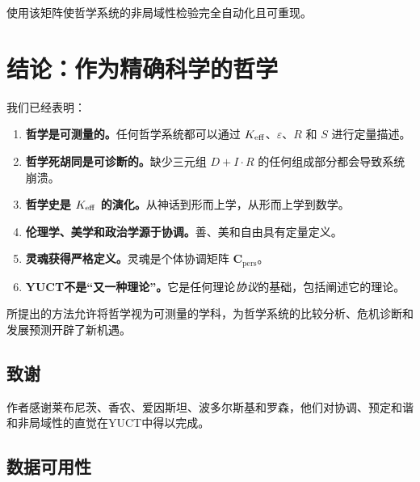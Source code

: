\documentclass[11pt,a4paper]{article}
\newcommand{\eps}{\varepsilon}
\newcommand{\Cpers}{\mathbf{C}_{\text{pers}}}
\begin{document}
	使用该矩阵使哲学系统的非局域性检验完全自动化且可重现。
	
	
	\section{结论：作为精确科学的哲学}
	
	我们已经表明：
	
	\begin{enumerate}
		\item \textbf{哲学是可测量的。}任何哲学系统都可以通过 \(\Keff\)、\(\eps\)、\(R\) 和 \(S\) 进行定量描述。
		\item \textbf{哲学死胡同是可诊断的。}缺少三元组 \(D + I \cdot R\) 的任何组成部分都会导致系统崩溃。
		\item \textbf{哲学史是 \(\Keff\) 的演化。}从神话到形而上学，从形而上学到数学。
		\item \textbf{伦理学、美学和政治学源于协调。}善、美和自由具有定量定义。
		\item \textbf{灵魂获得严格定义。}灵魂是个体协调矩阵 \(\Cpers\)。
		\item \textbf{YUCT不是“又一种理论”。}它是任何理论\emph{协议}的基础，包括阐述它的理论。
	\end{enumerate}
	
	所提出的方法允许将哲学视为可测量的学科，为哲学系统的比较分析、危机诊断和发展预测开辟了新机遇。
	
	\begin{center}
	\end{center}
	
	\subsection*{致谢}
	
	作者感谢莱布尼茨、香农、爱因斯坦、波多尔斯基和罗森，他们对协调、预定和谐和非局域性的直觉在YUCT中得以完成。
	
	\subsection*{数据可用性}
	
\end{document}
